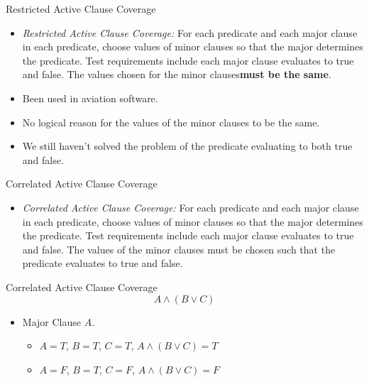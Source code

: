 \documentclass{beamer}
\begin{document}
\begin{frame}{Restricted Active Clause Coverage}
  \begin{itemize}
  \item {\em Restricted Active Clause Coverage:} For each predicate
    and each major clause in each predicate, choose values of minor
    clauses so that the major determines the predicate. Test
    requirements include each major clause evaluates to true and
    false. The values chosen for the minor clauses{\bf must be the
      same}.
  \item Been used in aviation software. 
  \item No logical reason for the values of the minor clauses to be
    the same. 
  \item We still haven't solved the problem of the predicate
    evaluating to both true and false.
  \end{itemize}
  
\end{frame}
\begin{frame}{Correlated Active Clause Coverage}
  \begin{itemize}
  \item {\em Correlated Active Clause Coverage:} For each predicate
    and each major clause in each predicate, choose values of minor
    clauses so that the major determines the predicate. Test
    requirements include each major clause evaluates to true and
    false. The values of the minor clauses must be chosen such that
    the predicate evaluates to true and false.
  \end{itemize}
\end{frame}
\begin{frame}{Correlated Active Clause Coverage}
  \[
   A \land (B \lor C)
  \]
  \begin{itemize}
  \item Major Clause $A$.
    \begin{itemize}
    \item $A=T$, $B=T$, $C=T$, $A\land (B\lor C)=T$
    \item $A=F$, $B=T$, $C=F$, $A\land (B\lor C)=F$
    \end{itemize}
  \end{itemize}
\end{frame}
\end{document}
